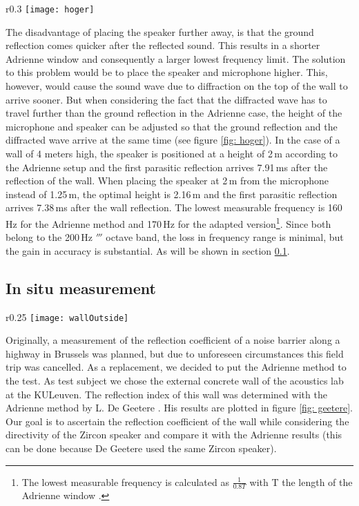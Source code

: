 \begin{wrapfigure}{r}{0.3\textwidth}
  \centering
    \texttt{[image: hoger]}
  \caption{Paths of the ground reflection and top diffraction.}
  \label{fig: hoger}
\end{wrapfigure}
The disadvantage of placing the speaker further away, is that the ground reflection comes quicker after the reflected sound. This results in a shorter Adrienne window and consequently a larger lowest frequency limit. The solution to this problem would be to place the speaker and microphone higher. This, however, would cause the sound wave due to diffraction on the top of the wall to arrive sooner. But when considering the fact that the diffracted wave has to travel further than the ground reflection in the Adrienne case, the height of the microphone and speaker can be adjusted so that the ground reflection and the diffracted wave arrive at the same time (see figure \ref{fig: hoger}). In the case of a wall of 4 meters high, the speaker is positioned at a height of 2\,m according to the Adrienne setup and the first parasitic reflection arrives 7.91\,ms after the reflection of the wall. When placing the speaker at 2\,m from the microphone instead of 1.25\,m, the optimal height is 2.16\,m and the first parasitic reflection arrives 7.38\,ms after the wall reflection. The lowest measurable frequency is 160\,Hz for the Adrienne method and 170\,Hz for the adapted version\footnote{The lowest measurable frequency is calculated as $\frac{1}{0.8 T}$ with T the length of the Adrienne window \cite[p.70]{Geetere}.}. Since both belong to the 200\,Hz $\third$ octave band, the loss in frequency range is minimal, but the gain in accuracy is substantial. As will be shown in section \ref{insitu}.




\subsection{In situ measurement}\label{insitu}
\begin{wrapfigure}{r}{0.25\textwidth}
	\vspace{-10pt}
  \centering
    \texttt{[image: wallOutside]}
  \caption{Picture of the wall and setup.}
  \label{fig: wall}
\end{wrapfigure}
Originally, a measurement of the reflection coefficient of a noise barrier along a highway in Brussels was planned, but due to unforeseen circumstances this field trip was cancelled. As a replacement, we decided to put the Adrienne method to the test. As test subject we chose the external concrete wall of the acoustics lab at the KULeuven. The reflection index of this wall was determined with the Adrienne method by L. De Geetere \cite[p.68]{Geetere}. His results are plotted in figure \ref{fig: geetere}. Our goal is to ascertain the reflection coefficient of the wall while considering the directivity of the Zircon speaker and compare it with the Adrienne results (this can be done because De Geetere used the same Zircon speaker). 

